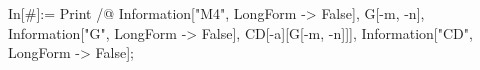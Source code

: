 In[#]:= Print /@ {Information["M4", LongForm -> False], G[-m, -n], Information["G", LongForm -> False], CD[-a][G[-m, -n]]], Information["CD", LongForm -> False]}; 